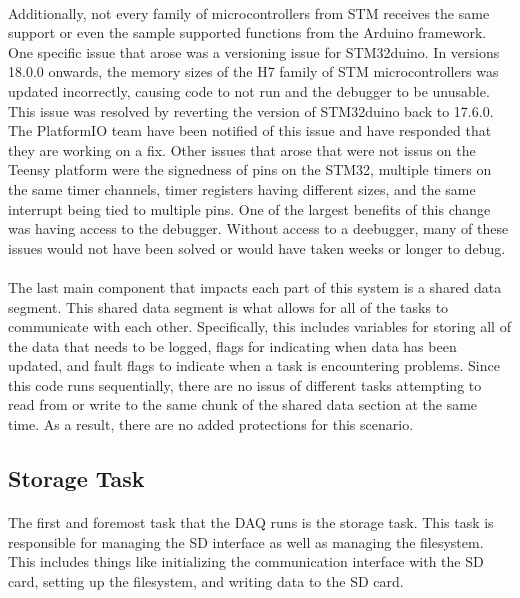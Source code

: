 \paragraph{}
Additionally, not every family of microcontrollers from STM receives the same support or even the sample supported functions from the Arduino framework.
One specific issue that arose was a versioning issue for STM32duino.
In versions 18.0.0 onwards, the memory sizes of the H7 family of STM microcontrollers was updated incorrectly, causing code to not run and the debugger to be unusable.
This issue was resolved by reverting the version of STM32duino back to 17.6.0.
The PlatformIO team have been notified of this issue and have responded that they are working on a fix.
Other issues that arose that were not issus on the Teensy platform were the signedness of pins on the STM32, multiple timers on the same timer channels, timer registers having different sizes, and the same interrupt being tied to multiple pins.
One of the largest benefits of this change was having access to the debugger.
Without access to a deebugger, many of these issues would not have been solved or would have taken weeks or longer to debug.

\paragraph{}
The last main component that impacts each part of this system is a shared data segment.
This shared data segment is what allows for all of the tasks to communicate with each other.
Specifically, this includes variables for storing all of the data that needs to be logged, flags for indicating when data has been updated, and fault flags to indicate when a task is encountering problems.
Since this code runs sequentially, there are no issus of different tasks attempting to read from or write to the same chunk of the shared data section at the same time.
As a result, there are no added protections for this scenario.

\subsection{Storage Task}

\paragraph{}
The first and foremost task that the DAQ runs is the storage task.
This task is responsible for managing the SD interface as well as managing the filesystem.
This includes things like initializing the communication interface with the SD card, setting up the filesystem, and writing data to the SD card.

